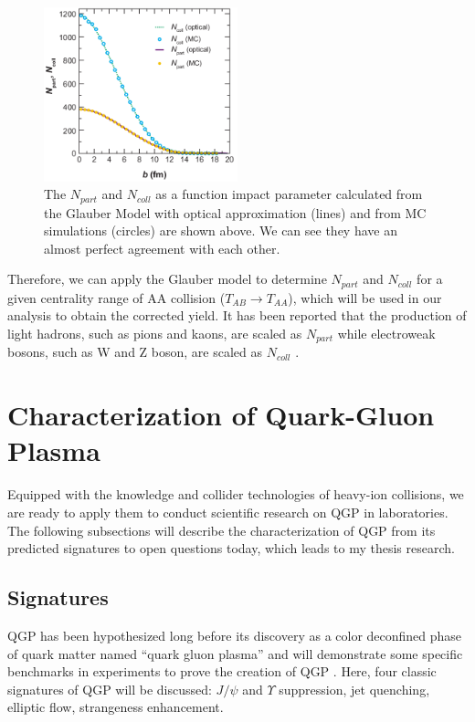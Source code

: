 \begin{figure}[hbtp]
\begin{center}
\includegraphics[width=0.50\textwidth]{Figures/Chapter1/NPartandNColl.png}
\caption{The $N_{part}$ and $N_{coll}$ as a function impact parameter calculated from the Glauber Model with optical approximation (lines) and from MC simulations (circles) are shown above. We can see they have an almost perfect agreement with each other.}
\label{NPartandNColl}
\end{center}
\end{figure} 


Therefore, we can apply the Glauber model to determine $N_{part}$ and $N_{coll}$ for a given centrality range of AA collision ($T_{AB} \rightarrow T_{AA}$), which will be used in our analysis to obtain the corrected yield. It has been reported that the production of light hadrons, such as pions and kaons, are scaled as $N_{part}$ \cite{NPartScaling} while electroweak bosons, such as W and Z boson, are scaled as $N_{coll}$ \cite{NCollScaling}.

\section{Characterization of Quark-Gluon Plasma}

Equipped with the knowledge and collider technologies of heavy-ion collisions, we are ready to apply them to conduct scientific research on QGP in laboratories. The following subsections will describe the characterization of QGP from its predicted signatures to open questions today, which leads to my thesis research.

\subsection{Signatures}

QGP has been hypothesized long before its discovery as a color deconfined phase of quark matter named ``quark gluon plasma'' \cite{LeonQGP} and will demonstrate some specific benchmarks in experiments to prove the creation of QGP \cite{QGPSignature}. Here, four classic signatures of QGP will be discussed: $J/\psi$ and $\Upsilon$ suppression, jet quenching, elliptic flow, strangeness enhancement.  

